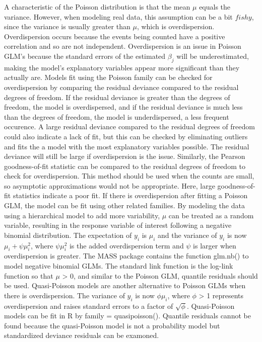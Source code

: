 \documentclass[
]{book}
\begin{document}
A characteristic of the Poisson distribution is that the mean \(\mu\) equals the variance. However, when modeling real data, this assumption can be a bit \({fishy}\), since the variance is usually greater than \(\mu\), which is overdispersion. Overdispersion occurs because the events being counted have a positive correlation and so are not independent. Overdispersion is an issue in Poisson GLM's because the standard errors of the estimated \(\beta_j\) will be underestimated, making the model's explanatory variables appear more significant than they actually are. Models fit using the Poisson family can be checked for overdispersion by comparing the residual deviance compared to the residual degrees of freedom. If the residual deviance is greater than the degrees of freedom, the model is overdispersed, and if the residual deviance is much less than the degrees of freedom, the model is underdispersed, a less frequent occurence. A large residual deviance compared to the residual degrees of freedom could also indicate a lack of fit, but this can be checked by eliminating outliers and fits the a model with the most explanatory variables possible. The residual deviance will still be large if overdispersion is the issue. Similarly, the Pearson goodness-of-fit statistic can be compared to the residual degrees of freedom to check for overdispersion. This method should be used when the counts are small, so asymptotic approximations would not be appropriate. Here, large goodness-of-fit statistics indicate a poor fit. If there is overdispersion after fitting a Poisson GLM, the model can be fit using other related families. By modeling the data using a hierarchical model to add more variability, \(\mu\) can be treated as a random variable, resulting in the response variable of interest following a negative binomial distribution. The expectation of \(y_i\) is \(\mu_i\) and the variance of \(y_i\) is now \(\mu_i + \psi\mu_i^2\), where \(\psi\mu_i^2\) is the added overdispersion term and \(\psi\) is larger when overdispersion is greater. The MASS package contains the function glm.nb() to model negative binomial GLMs. The standard link function is the log-link function so that \(\mu\) \textgreater{} 0, and similar to the Poisson GLM, quantile residuals should be used. Quasi-Poisson models are another alternative to Poisson GLMs when there is overdispersion. The variance of \(y_i\) is now \(\phi\mu_i\), where \(\phi\) \textgreater{} 1 represents overdispersion and raises standard errors to a factor of \(\sqrt{\phi}\). Quasi-Poisson models can be fit in R by family = quasipoisson(). Quantile residuals cannot be found because the quasi-Poisson model is not a probability model but standardized deviance residuals can be examoned.
\end{document}
